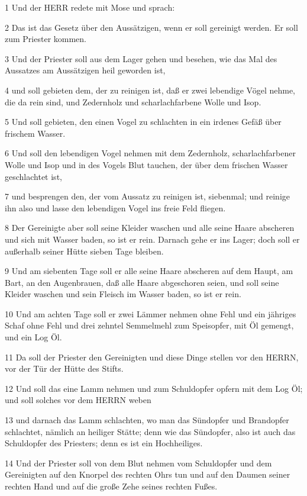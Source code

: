 \par 1 Und der HERR redete mit Mose und sprach:
\par 2 Das ist das Gesetz über den Aussätzigen, wenn er soll gereinigt werden. Er soll zum Priester kommen.
\par 3 Und der Priester soll aus dem Lager gehen und besehen, wie das Mal des Aussatzes am Aussätzigen heil geworden ist,
\par 4 und soll gebieten dem, der zu reinigen ist, daß er zwei lebendige Vögel nehme, die da rein sind, und Zedernholz und scharlachfarbene Wolle und Isop.
\par 5 Und soll gebieten, den einen Vogel zu schlachten in ein irdenes Gefäß über frischem Wasser.
\par 6 Und soll den lebendigen Vogel nehmen mit dem Zedernholz, scharlachfarbener Wolle und Isop und in des Vogels Blut tauchen, der über dem frischen Wasser geschlachtet ist,
\par 7 und besprengen den, der vom Aussatz zu reinigen ist, siebenmal; und reinige ihn also und lasse den lebendigen Vogel ins freie Feld fliegen.
\par 8 Der Gereinigte aber soll seine Kleider waschen und alle seine Haare abscheren und sich mit Wasser baden, so ist er rein. Darnach gehe er ins Lager; doch soll er außerhalb seiner Hütte sieben Tage bleiben.
\par 9 Und am siebenten Tage soll er alle seine Haare abscheren auf dem Haupt, am Bart, an den Augenbrauen, daß alle Haare abgeschoren seien, und soll seine Kleider waschen und sein Fleisch im Wasser baden, so ist er rein.
\par 10 Und am achten Tage soll er zwei Lämmer nehmen ohne Fehl und ein jähriges Schaf ohne Fehl und drei zehntel Semmelmehl zum Speisopfer, mit Öl gemengt, und ein Log Öl.
\par 11 Da soll der Priester den Gereinigten und diese Dinge stellen vor den HERRN, vor der Tür der Hütte des Stifts.
\par 12 Und soll das eine Lamm nehmen und zum Schuldopfer opfern mit dem Log Öl; und soll solches vor dem HERRN weben
\par 13 und darnach das Lamm schlachten, wo man das Sündopfer und Brandopfer schlachtet, nämlich an heiliger Stätte; denn wie das Sündopfer, also ist auch das Schuldopfer des Priesters; denn es ist ein Hochheiliges.
\par 14 Und der Priester soll von dem Blut nehmen vom Schuldopfer und dem Gereinigten auf den Knorpel des rechten Ohrs tun und auf den Daumen seiner rechten Hand und auf die große Zehe seines rechten Fußes.
